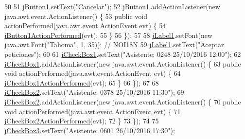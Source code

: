 \begin{DoxyCode}
50 
51         \mbox{\hyperlink{classsoftware_1_1_aceptar_peticiones_a0dbb46cb648a55e144e5334959c9a068}{jButton1}}.setText(\textcolor{stringliteral}{"Cancelar"});
52         \mbox{\hyperlink{classsoftware_1_1_aceptar_peticiones_a0dbb46cb648a55e144e5334959c9a068}{jButton1}}.addActionListener(\textcolor{keyword}{new} java.awt.event.ActionListener() \{
53             \textcolor{keyword}{public} \textcolor{keywordtype}{void} actionPerformed(java.awt.event.ActionEvent evt) \{
54                 \mbox{\hyperlink{classsoftware_1_1_aceptar_peticiones_ad0a52e08d96fc121660bf6c65ee56b88}{jButton1ActionPerformed}}(evt);
55             \}
56         \});
57 
58         \mbox{\hyperlink{classsoftware_1_1_aceptar_peticiones_a4678a7287858835aca98294897b6e05c}{jLabel1}}.setFont(\textcolor{keyword}{new} java.awt.Font(\textcolor{stringliteral}{"Tahoma"}, 1, 35)); \textcolor{comment}{// NOI18N}
59         \mbox{\hyperlink{classsoftware_1_1_aceptar_peticiones_a4678a7287858835aca98294897b6e05c}{jLabel1}}.setText(\textcolor{stringliteral}{"Aceptar peticiones"});
60 
61         \mbox{\hyperlink{classsoftware_1_1_aceptar_peticiones_aaa4f8e7bc9bf52be8ee72e4baf0ccce6}{jCheckBox1}}.setText(\textcolor{stringliteral}{"Asistente: 0248 25/10/2016 12:00"});
62         \mbox{\hyperlink{classsoftware_1_1_aceptar_peticiones_aaa4f8e7bc9bf52be8ee72e4baf0ccce6}{jCheckBox1}}.addActionListener(\textcolor{keyword}{new} java.awt.event.ActionListener() \{
63             \textcolor{keyword}{public} \textcolor{keywordtype}{void} actionPerformed(java.awt.event.ActionEvent evt) \{
64                 \mbox{\hyperlink{classsoftware_1_1_aceptar_peticiones_a290ec180fd67647791d5ae0c9868b588}{jCheckBox1ActionPerformed}}(evt);
65             \}
66         \});
67 
68         \mbox{\hyperlink{classsoftware_1_1_aceptar_peticiones_aedf3e1a05531ef046c98a870dfe5f898}{jCheckBox2}}.setText(\textcolor{stringliteral}{"Asistente: 0378 25/10/2016 11:30"});
69         \mbox{\hyperlink{classsoftware_1_1_aceptar_peticiones_aedf3e1a05531ef046c98a870dfe5f898}{jCheckBox2}}.addActionListener(\textcolor{keyword}{new} java.awt.event.ActionListener() \{
70             \textcolor{keyword}{public} \textcolor{keywordtype}{void} actionPerformed(java.awt.event.ActionEvent evt) \{
71                 \mbox{\hyperlink{classsoftware_1_1_aceptar_peticiones_ae615808bf27e05f1c9368e352141520e}{jCheckBox2ActionPerformed}}(evt);
72             \}
73         \});
74 
75         \mbox{\hyperlink{classsoftware_1_1_aceptar_peticiones_a7b914f4724640bc95273e5119651f9a7}{jCheckBox3}}.setText(\textcolor{stringliteral}{"Asistente: 0601 26/10/2016 17:30"});

\end{DoxyCode}
